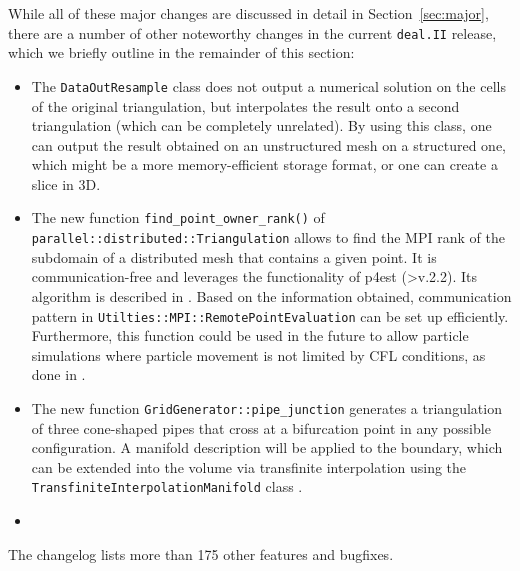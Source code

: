 \documentclass{ansarticle-preprint}
\newcommand{\specialword}[1]{\texttt{#1}}
\newcommand{\dealii}{{\specialword{deal.II}}\xspace}
\begin{document}
While all of these major changes are discussed in detail in
Section~\ref{sec:major}, there
are a number of other noteworthy changes in the current \dealii{} release,
which we briefly outline in the remainder of this section:
%
\begin{itemize}
  \item The \texttt{DataOutResample} class does not output a numerical solution 
  on the cells of the original triangulation, but interpolates the result 
  onto a second triangulation (which can be completely unrelated). 
  By using this class, one can output the result obtained on an 
  unstructured mesh on a structured one, which might be a more
  memory-efficient storage format, or one can create a slice in 3D.
  \item The new function \texttt{find\_point\_owner\_rank()} of \texttt{parallel::distributed::Triangulation} allows to find the MPI
  rank of the subdomain of a distributed mesh that contains a given point.
  It is communication-free and leverages the functionality of p4est (>v.2.2).
  Its algorithm is described in \cite{burstedde2020parallel}. Based on the information obtained,
  communication pattern in \texttt{Utilties::MPI::RemotePointEvaluation} can be set up efficiently. Furthermore, this function could be used in the future to allow
  particle simulations where particle movement is not
  limited by CFL conditions, as done in \cite{mirzadeh2016parallel}.
  \item The new function
  \texttt{GridGenerator::pipe\_junction}
  generates a triangulation of three cone-shaped pipes that cross at a bifurcation point in any possible configuration.
  A manifold description will be applied to the boundary, which can be extended into the volume via transfinite interpolation \cite{Gordon82} using the \texttt{TransfiniteInterpolationManifold} class \cite{dealII90}.
  \item {}
\end{itemize}
%
The changelog lists more than 175 other features and bugfixes.




\end{document}
